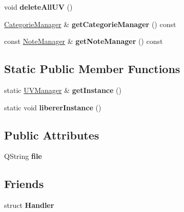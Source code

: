 \begin{DoxyCompactItemize}
\item 
\hypertarget{class_u_v_manager_a95333fbf72dee3874c2e6492969dbfac}{void {\bfseries delete\+All\+U\+V} ()}\label{class_u_v_manager_a95333fbf72dee3874c2e6492969dbfac}

\item 
\hypertarget{class_u_v_manager_a17d95c67bc2d1f4c9d850fb0b9c42262}{\hyperlink{class_categorie_manager}{Categorie\+Manager} \& {\bfseries get\+Categorie\+Manager} () const }\label{class_u_v_manager_a17d95c67bc2d1f4c9d850fb0b9c42262}

\item 
\hypertarget{class_u_v_manager_af1118627f6a08c3ae828f7d46e683e06}{const \hyperlink{class_note_manager}{Note\+Manager} \& {\bfseries get\+Note\+Manager} () const }\label{class_u_v_manager_af1118627f6a08c3ae828f7d46e683e06}

\end{DoxyCompactItemize}
\subsection*{Static Public Member Functions}
\begin{DoxyCompactItemize}
\item 
\hypertarget{class_u_v_manager_a68d219c83584116722ceb5fea3813e12}{static \hyperlink{class_u_v_manager}{U\+V\+Manager} \& {\bfseries get\+Instance} ()}\label{class_u_v_manager_a68d219c83584116722ceb5fea3813e12}

\item 
\hypertarget{class_u_v_manager_abc80aed5b064c9ba0894f41305490052}{static void {\bfseries liberer\+Instance} ()}\label{class_u_v_manager_abc80aed5b064c9ba0894f41305490052}

\end{DoxyCompactItemize}
\subsection*{Public Attributes}
\begin{DoxyCompactItemize}
\item 
\hypertarget{class_u_v_manager_ace844550b9018b15815e04d3b5c115c4}{Q\+String {\bfseries file}}\label{class_u_v_manager_ace844550b9018b15815e04d3b5c115c4}

\end{DoxyCompactItemize}
\subsection*{Friends}
\begin{DoxyCompactItemize}
\item 
\hypertarget{class_u_v_manager_a7ab9a1e3d1a8ab9a8badf544bf7e0197}{struct {\bfseries Handler}}\label{class_u_v_manager_a7ab9a1e3d1a8ab9a8badf544bf7e0197}

\end{DoxyCompactItemize}


